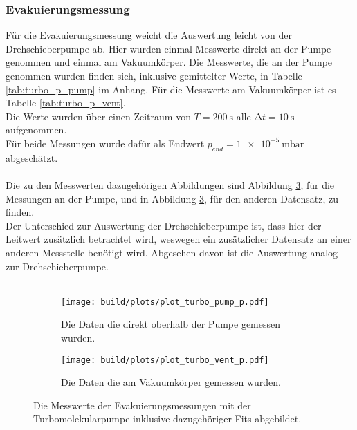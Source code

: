         \subsubsection{Evakuierungsmessung}

        \noindent
        Für die Evakuierungsmessung weicht die Auswertung leicht von der Drehschieberpumpe ab. 
        Hier wurden einmal Messwerte direkt an der Pumpe genommen und einmal am Vakuumkörper. 
        Die Messwerte, die an der Pumpe genommen wurden finden sich, inklusive gemittelter Werte, in Tabelle \ref{tab:turbo_p_pump} im Anhang. 
        Für die Messwerte am Vakuumkörper ist es Tabelle \ref{tab:turbo_p_vent}. \\
        Die Werte wurden über einen Zeitraum von $ T = \SI{200}{\second}$ alle $ \increment t = \SI{10}{\second}$ aufgenommen.\\
        Für beide Messungen wurde dafür als Endwert $p_{end} = \SI{1e-5}{\milli\bar}$ abgeschätzt.\\\\
        Die zu den Messwerten dazugehörigen Abbildungen sind Abbildung \ref{img:2}, 
        für die Messungen an der Pumpe, und in Abbildung \ref{img:2}, für den anderen Datensatz, zu finden.\\
        Der Unterschied zur Auswertung der Drehschieberpumpe ist, dass hier der Leitwert zusätzlich betrachtet wird, 
        weswegen ein zusätzlicher Datensatz an einer anderen Messstelle benötigt wird.
        Abgesehen davon ist die Auswertung analog zur Drehschieberpumpe.\\\\
        \begin{figure}[H]
          \begin{subfigure}{0.46\textwidth}
                  \centering
                  \texttt{[image: build/plots/plot\_turbo\_pump\_p.pdf]}
                  \caption{Die Daten die direkt oberhalb der Pumpe gemessen wurden.}
                  \label{img:turbo_pump_p}
          \end{subfigure}
          \hfill
          \begin{subfigure}{0.46\textwidth}
                  \centering
                  \texttt{[image: build/plots/plot\_turbo\_vent\_p.pdf]}
                  \caption{Die Daten die am Vakuumkörper gemessen wurden.}
                  \label{img:turbo_vent_p}
          \end{subfigure}
          \caption{Die Messwerte der Evakuierungsmessungen mit der Turbomolekularpumpe inklusive 
                    dazugehöriger Fits abgebildet. }
          \label{img:2}
      \end{figure}
